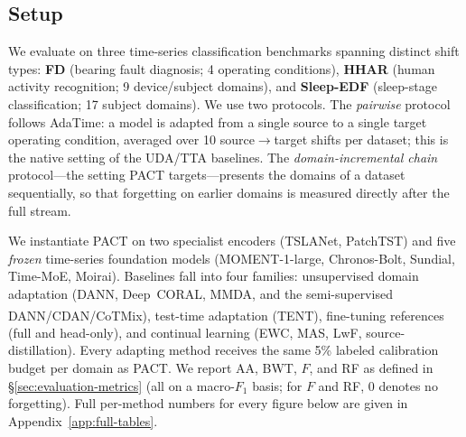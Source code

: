 \subsection{Setup}
\label{sec:setup}
We evaluate on three time-series classification benchmarks spanning
distinct shift types: \textbf{FD} (bearing fault diagnosis; 4 operating
conditions), \textbf{HHAR} (human activity recognition; 9 device/subject
domains), and \textbf{Sleep-EDF} (sleep-stage classification; 17 subject
domains). We use two protocols. The \emph{pairwise} protocol follows
AdaTime: a model is adapted from a single source to a single target
operating condition, averaged over 10 source$\rightarrow$target shifts per
dataset; this is the native setting of the UDA/TTA baselines. The
\emph{domain-incremental chain} protocol---the setting PACT
targets---presents the domains of a dataset sequentially, so that
forgetting on earlier domains is measured directly after the full stream.

We instantiate PACT on two specialist encoders (TSLANet, PatchTST) and
five \emph{frozen} time-series foundation models (MOMENT-1-large,
Chronos-Bolt, Sundial, Time-MoE, Moirai). Baselines fall into four families: unsupervised
domain adaptation (DANN, Deep~CORAL, MMDA, and the semi-supervised
DANN\textsuperscript{\dag}/CDAN\textsuperscript{\dag}/CoTMix\textsuperscript{\dag}),
test-time adaptation (TENT), fine-tuning references (full and head-only),
and continual learning (EWC, MAS, LwF, source-distillation). Every
adapting method receives the same 5\% labeled calibration budget per
domain as PACT. We report AA, BWT, $F$, and RF as defined in
\S\ref{sec:evaluation-metrics} (all on a macro-$F_1$ basis; for $F$ and
RF, $0$ denotes no forgetting). Full per-method numbers for every figure
below are given in Appendix~\ref{app:full-tables}.

